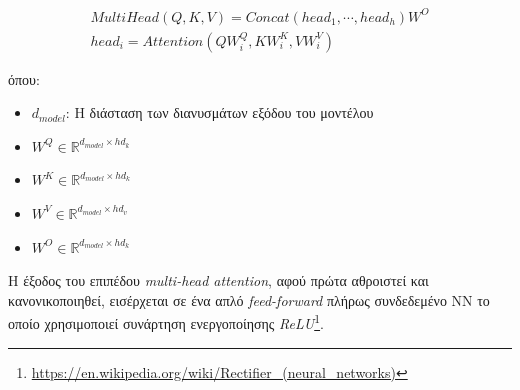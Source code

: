 \begin{equation} \label{eq:multi-head}
\begin{split}
    MultiHead(Q,K,V) = Concat(head_1, \cdots, head_h)W^O \\
    head_i= Attention(QW_i^Q, KW_i^K,VW_i^V)
\end{split}
\end{equation}

όπου:
\begin{itemize}
    \item $d_{model}$: Η διάσταση των διανυσμάτων εξόδου του μοντέλου
    \item $W^Q \in \mathbb{R}^{d_{model} \times hd_k} $
    \item $W^K \in \mathbb{R}^{d_{model}\times  hd_k} $
    \item $W^V \in \mathbb{R}^{d_{model} \times  hd_v} $
    \item $W^O \in \mathbb{R}^{d_{model}\times  hd_k} $
\end{itemize}

Η έξοδος του επιπέδου \emph{multi-head attention}, αφού πρώτα αθροιστεί και κανονικοποιηθεί, εισέρχεται σε ένα απλό \emph{feed-forward} πλήρως συνδεδεμένο NN το οποίο χρησιμοποιεί συνάρτηση ενεργοποίησης \emph{ReLU}\footnote{\url{https://en.wikipedia.org/wiki/Rectifier_(neural_networks)}}.